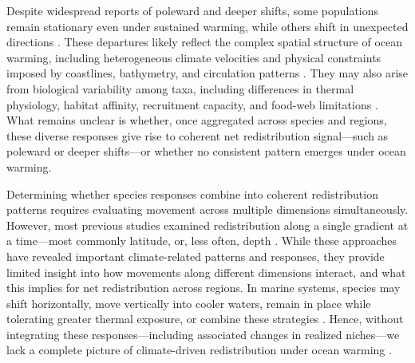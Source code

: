 \documentclass[pdflatex,sn-nature,referee]{sn-jnl}%
\begin{document}
Despite widespread reports of poleward and deeper shifts, some populations remain stationary even under sustained warming, while others shift in unexpected directions \citep{rubenstein_climate_2023, fuchs_wrong-way_2020, lawlor_mechanisms_2024}. These departures likely reflect the complex spatial structure of ocean warming, including heterogeneous climate velocities and physical constraints imposed by coastlines, bathymetry, and circulation patterns \citep{burrows_pace_2011, pinsky_marine_2013}. They may also arise from biological variability among taxa, including differences in thermal physiology, habitat affinity, recruitment capacity, and food-web limitations \citep{sunday_species_2015, roberts_substrate-dependent_2020, britten_changing_2016, zhang_food-web_2017}. What remains unclear is whether, once aggregated across species and regions, these diverse responses give rise to coherent net redistribution signal---such as poleward or deeper shifts---or whether no consistent pattern emerges under ocean warming. %

Determining whether species responses combine into coherent redistribution patterns requires evaluating movement across multiple dimensions simultaneously. However, most previous studies examined redistribution along a single gradient at a time---most commonly latitude, or, less often, depth \citep{lenoir_climate-related_2015}. While these approaches have revealed important climate-related patterns and responses, they provide limited insight into how movements along different dimensions interact, and what this implies for net redistribution across regions. In marine systems, species may shift horizontally, move vertically into cooler waters, remain in place while tolerating greater thermal exposure, or combine these strategies \citep{nye_changing_2009}. Hence, without integrating these responses---including associated changes in realized niches---we lack a complete picture of climate-driven redistribution under ocean warming \citep{lawlor_mechanisms_2024, fredston_reimagining_2025}.
\end{document}
